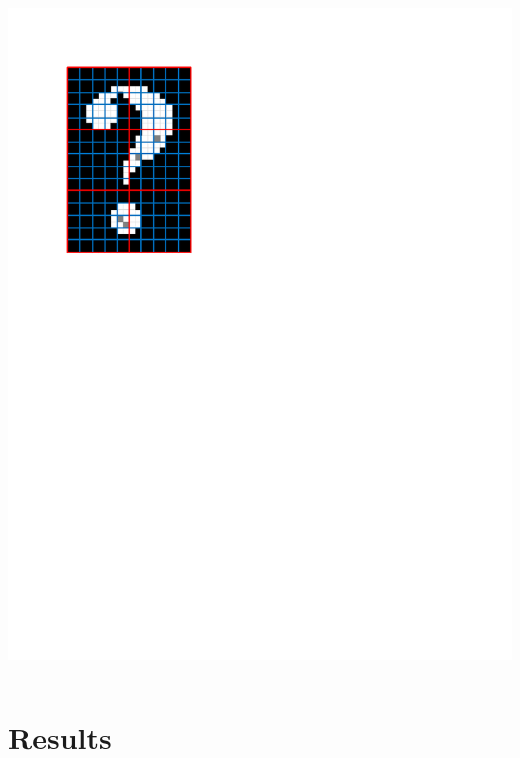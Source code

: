 \documentclass{beamer}
\begin{document}
\begin{frame}
\begin{columns}
\begin{column}{0.45\textwidth}
\begin{center}
\includegraphics[width=1\textwidth,trim={0 6.5in 4in 1in},clip]{replace_defect_2}
\end{center}
\end{column}
\end{columns}
\end{frame}

\section[Results]{Results}
\end{document}
